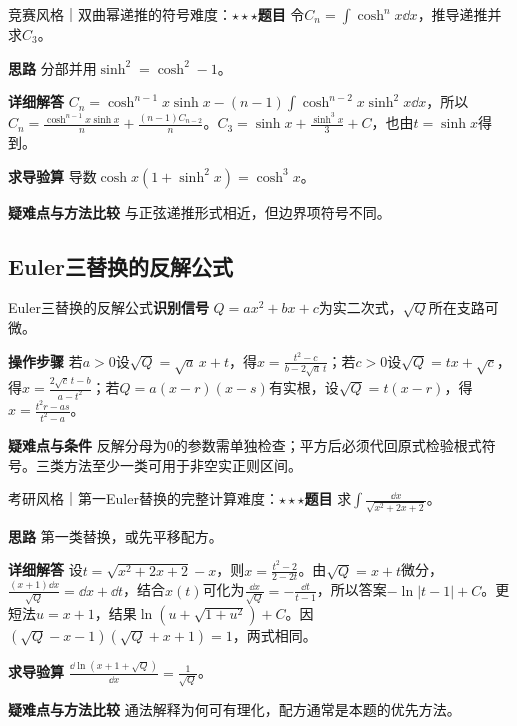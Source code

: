 \begin{example}{竞赛风格｜双曲幂递推的符号}{难度：$\star\star\star$}\label{ic:ex:indefinite_classical_complete:hyperbolicpower}\textbf{题目} 令$C_n=\int\cosh^nx\dd x$，推导递推并求$C_3$。\par \textbf{思路} 分部并用$\sinh^2=\cosh^2-1$。\par \textbf{详细解答} $C_n=\cosh^{n-1}x\sinh x-(n-1)\int\cosh^{n-2}x\sinh^2x\dd x$，所以$C_n=\frac{\cosh^{n-1}x\sinh x}{n}+\frac{(n-1)C_{n-2}}{n}$。$C_3=\sinh x+\frac{\sinh^3x}{3}+C$，也由$t=\sinh x$得到。\par \textbf{求导验算} 导数$\cosh x(1+\sinh^2x)=\cosh^3x$。\par \textbf{疑难点与方法比较} 与正弦递推形式相近，但边界项符号不同。\end{example}

\subsection{Euler三替换的反解公式}\label{ic:indefinite_classical_complete:eulerthree}\begin{method}{Euler三替换的反解公式}\textbf{识别信号} $Q=ax^2+bx+c$为实二次式，$\sqrt Q$所在支路可微。\par \textbf{操作步骤} 若$a>0$设$\sqrt Q=\sqrt a\,x+t$，得$x=\frac{t^2-c}{b-2\sqrt a\,t}$；若$c>0$设$\sqrt Q=tx+\sqrt c$，得$x=\frac{2\sqrt c\,t-b}{a-t^2}$；若$Q=a(x-r)(x-s)$有实根，设$\sqrt Q=t(x-r)$，得$x=\frac{t^2r-as}{t^2-a}$。\par \textbf{疑难点与条件} 反解分母为0的参数需单独检查；平方后必须代回原式检验根式符号。三类方法至少一类可用于非空实正则区间。\end{method}

\begin{example}{考研风格｜第一Euler替换的完整计算}{难度：$\star\star\star$}\label{ic:ex:indefinite_classical_complete:eulerfirst}\textbf{题目} 求$\int\frac{\dd x}{\sqrt{x^2+2x+2}}$。\par \textbf{思路} 第一类替换，或先平移配方。\par \textbf{详细解答} 设$t=\sqrt{x^2+2x+2}-x$，则$x=\frac{t^2-2}{2-2t}$。由$\sqrt Q=x+t$微分，$\frac{(x+1)\dd x}{\sqrt Q}=\dd x+\dd t$，结合$x(t)$可化为$\frac{\dd x}{\sqrt Q}=-\frac{\dd t}{t-1}$，所以答案$-\ln|t-1|+C$。更短法$u=x+1$，结果$\ln(u+\sqrt{1+u^2})+C$。因$(\sqrt Q-x-1)(\sqrt Q+x+1)=1$，两式相同。\par \textbf{求导验算} $\frac{\dd\ln(x+1+\sqrt Q)}{\dd x}=\frac{1}{\sqrt Q}$。\par \textbf{疑难点与方法比较} 通法解释为何可有理化，配方通常是本题的优先方法。\end{example}

